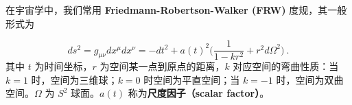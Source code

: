 
在宇宙学中，我们常用 \textbf{Friedmann-Robertson-Walker (FRW)} 度规，其一般形式为

\begin{equation}
ds^2=g_{\mu\nu}dx^{\mu}dx^{\nu}=-dt^2+a(t)^2\Big(\frac{1}{1-kr^2}+r^2 d \Omega^2\Big)~.
\end{equation}
其中 $t$ 为时间坐标，$r$ 为空间某一点到原点的距离，$k$ 对应空间的弯曲性质：当 $k=1$ 时，空间为三维球；$k=0$ 时空间为平直空间；当 $k=-1$ 时，空间为双曲空间。$\Omega$ 为 $S^2$ 球面。$a(t)$ 称为\textbf{尺度因子（scalar factor）}。
